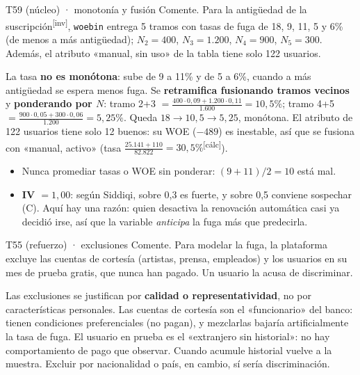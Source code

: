 \documentclass[10pt,a4paper]{article}
\newcommand{\inv}{\textsuperscript{\textcolor{red!60!black}{[inv]}}}
\newcommand{\calc}{\textsuperscript{\textcolor{blue!60!black}{[cálc]}}}
\begin{document}
\begin{enun}{T59 (núcleo) · monotonía y fusión}
Comente. Para la antigüedad de la suscripción\inv, \texttt{woebin} entrega 5 tramos con tasas de fuga de 18, 9, 11, 5 y 6\% (de menos a más antigüedad); $N_2=400$, $N_3=1.200$, $N_4=900$, $N_5=300$. Además, el atributo «manual, sin uso» de la tabla tiene solo 122 usuarios.
\end{enun}
\begin{ejemplar}
La tasa \textbf{no es monótona}: sube de 9 a 11\% y de 5 a 6\%, cuando a más antigüedad se espera menos fuga. Se \textbf{retramifica fusionando tramos vecinos} y \textbf{ponderando por $N$}: tramo 2+3 $=\frac{400\cdot0,09+1.200\cdot0,11}{1.600}=10{,}5\%$; tramo 4+5 $=\frac{900\cdot0,05+300\cdot0,06}{1.200}=5{,}25\%$. Queda $18\to10{,}5\to5{,}25$, monótona. El atributo de 122 usuarios tiene solo 12 buenos: su WOE ($-489$) es inestable, así que se fusiona con «manual, activo» (tasa $\frac{25.141+110}{82.822}=30{,}5\%$\calc).
\end{ejemplar}
\begin{trampa}
\begin{itemize}[leftmargin=*,itemsep=0pt,topsep=0pt]
\item Nunca promediar tasas o WOE sin ponderar: $(9+11)/2=10$ está mal.
\item \textbf{IV $=1{,}00$}: según Siddiqi, sobre 0,3 es fuerte, y sobre 0,5 conviene sospechar (C). Aquí hay una razón: quien desactiva la renovación automática casi ya decidió irse, así que la variable \emph{anticipa} la fuga más que predecirla.
\end{itemize}
\end{trampa}

\begin{enun}{T55 (refuerzo) · exclusiones}
Comente. Para modelar la fuga, la plataforma excluye las cuentas de cortesía (artistas, prensa, empleados) y los usuarios en su mes de prueba gratis, que nunca han pagado. Un usuario la acusa de discriminar.
\end{enun}
\begin{ejemplar}
Las exclusiones se justifican por \textbf{calidad o representatividad}, no por características personales. Las cuentas de cortesía son el «funcionario» del banco: tienen condiciones preferenciales (no pagan), y mezclarlas bajaría artificialmente la tasa de fuga. El usuario en prueba es el «extranjero sin historial»: no hay comportamiento de pago que observar. Cuando acumule historial vuelve a la muestra. Excluir por nacionalidad o país, en cambio, sí sería discriminación.
\end{ejemplar}
\end{document}
